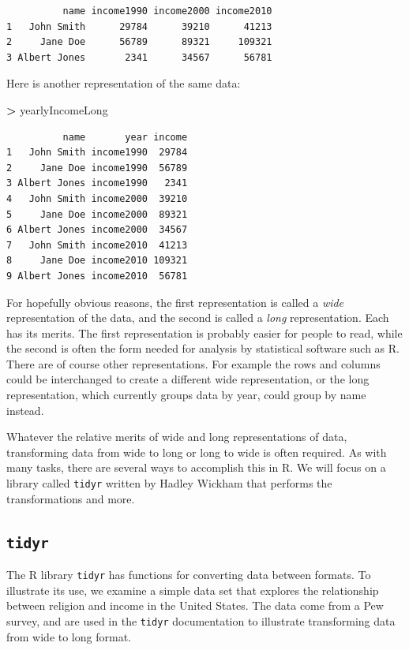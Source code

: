 \documentclass[
]{krantz}
\makeatletter
\newenvironment{Shaded}{\begin{snugshade}}{\end{snugshade}}
\newcommand{\NormalTok}[1]{#1}
\newcommand{\OperatorTok}[1]{\textcolor[rgb]{0.43,0.43,0.43}{\textbf{#1}}}
\newcommand{\StringTok}[1]{\textcolor[rgb]{0.5,0.5,0.5}{#1}}
\newenvironment{kframe}{%
\medskip{}
\setlength{\fboxsep}{.8em}
 \def\at@end@of@kframe{}%
 \ifinner\ifhmode%
  \def\at@end@of@kframe{\end{minipage}}%
  \begin{minipage}{\columnwidth}%
 \fi\fi%
 \def\FrameCommand##1{\hskip\@totalleftmargin \hskip-\fboxsep
 \colorbox{shadecolor}{##1}\hskip-\fboxsep
     \hskip-\linewidth \hskip-\@totalleftmargin \hskip\columnwidth}%
 \MakeFramed {\advance\hsize-\width
   \@totalleftmargin\z@ \linewidth\hsize
   \@setminipage}}%
 {\par\unskip\endMakeFramed%
 \at@end@of@kframe}
\renewenvironment{Shaded}{\begin{kframe}}{\end{kframe}}
\makeatother
\begin{document}
\begin{verbatim}
          name income1990 income2000 income2010
1   John Smith      29784      39210      41213
2     Jane Doe      56789      89321     109321
3 Albert Jones       2341      34567      56781
\end{verbatim}

Here is another representation of the same data:

\begin{Shaded}
\begin{Highlighting}[]
\OperatorTok{\textgreater{}}\StringTok{ }\NormalTok{yearlyIncomeLong}
\end{Highlighting}
\end{Shaded}

\begin{verbatim}
          name       year income
1   John Smith income1990  29784
2     Jane Doe income1990  56789
3 Albert Jones income1990   2341
4   John Smith income2000  39210
5     Jane Doe income2000  89321
6 Albert Jones income2000  34567
7   John Smith income2010  41213
8     Jane Doe income2010 109321
9 Albert Jones income2010  56781
\end{verbatim}

For hopefully obvious reasons, the first representation is called a \emph{wide} representation of the data, and the second is called a \emph{long} representation. Each has its merits. The first representation is probably easier for people to read, while the second is often the form needed for analysis by statistical software such as R. There are of course other representations. For example the rows and columns could be interchanged to create a different wide representation, or the long representation, which currently groups data by year, could group by name instead.

Whatever the relative merits of wide and long representations of data, transforming data from wide to long or long to wide is often required. As with many tasks, there are several ways to accomplish this in R. We will focus on a library called \texttt{tidyr} written by Hadley Wickham that performs the transformations and more.

\hypertarget{tidyr}{%
\subsection{\texorpdfstring{\texttt{tidyr}}{tidyr}}\label{tidyr}}

The R library \texttt{tidyr} has functions for converting data between formats. To illustrate its use, we examine a simple data set that explores the relationship between religion and income in the United States. The data come from a Pew survey, and are used in the \texttt{tidyr} documentation to illustrate transforming data from wide to long format.
\end{document}
